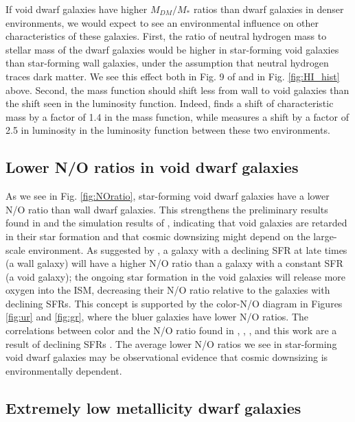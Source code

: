 If void dwarf galaxies have higher $M_{DM}/M_*$ ratios than dwarf galaxies in 
denser environments, we would expect to see an environmental influence on other 
characteristics of these galaxies.  First, the ratio of neutral hydrogen mass to 
stellar mass of the dwarf galaxies would be higher in star-forming void galaxies 
than star-forming wall galaxies, under the assumption that neutral hydrogen 
traces dark matter.  We see this effect both in Fig. 9 of \cite{Moorman16} and 
in Fig. \ref{fig:HI_hist} above.  Second, the  mass function should 
shift less from wall to void galaxies than the shift seen in the luminosity 
function.  Indeed, \cite{Moorman16} finds a shift of characteristic  
mass by a factor of 1.4 in the  mass function, while \cite{Hoyle05} 
measures a shift by a factor of 2.5 in luminosity in the luminosity function 
between these two environments.


\subsection{Lower N/O ratios in void dwarf galaxies}

As we see in Fig. \ref{fig:NOratio}, star-forming void dwarf galaxies have a 
lower N/O ratio than wall dwarf galaxies.  This strengthens the preliminary 
results found in \cite{Douglass17b} and the simulation results of \cite{Cen11}, 
indicating that void galaxies are retarded in their star formation and that 
cosmic downsizing might depend on the large-scale environment.  As suggested by 
\cite{vanZee06a}, a galaxy with a declining SFR at late times (a wall galaxy) 
will have a higher N/O ratio than a galaxy with a constant SFR (a void galaxy); 
the ongoing star formation in the void galaxies will release more oxygen into 
the ISM, decreasing their N/O ratio relative to the galaxies with declining 
SFRs.  This concept is supported by the color-N/O diagram in Figures 
\ref{fig:ur} and \ref{fig:gr}, where the bluer galaxies have lower N/O ratios.  
The correlations between color and the N/O ratio found in \cite{vanZee06a}, 
\cite{Berg12}, \cite{Douglass17b}, and this work are a result of declining SFRs 
\citep{vanZee06a}.  The average lower N/O ratios we see in star-forming void 
dwarf galaxies may be observational evidence that cosmic downsizing is 
environmentally dependent.


\subsection{Extremely low metallicity dwarf galaxies}

